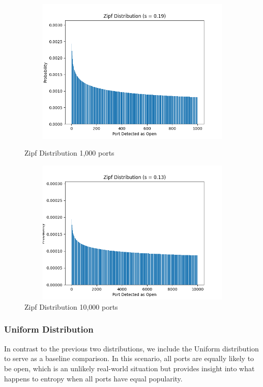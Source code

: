 \begin{figure}[H]
\begin{adjustwidth}{-3cm}{-1cm}
\centering
\begin{minipage}{.45\textwidth}
  \centering
\includegraphics[width=12cm, height=7cm, keepaspectratio]{entropy/img/zipf_distribution_1000.png}
    \caption{Zipf Distribution 1,000 ports}
    \label{fig:zipf_distribution_1000}
\end{minipage}
\hspace{0.5cm}
\begin{minipage}{.45\textwidth}
\includegraphics[width=12cm, height=7cm, keepaspectratio]{entropy/img/zipf_distribution_10000.png}
    \caption{Zipf Distribution 10,000 ports}
    \label{fig:zipf_distribution_10000}
\end{minipage}
\end{adjustwidth}
\end{figure}

\subsubsection{Uniform Distribution}

In contrast to the previous two distributions, we include the Uniform distribution to serve as a baseline comparison. In this scenario, all ports are equally likely to be open, which is an unlikely real-world situation but provides insight into what happens to entropy when all ports have equal popularity.


